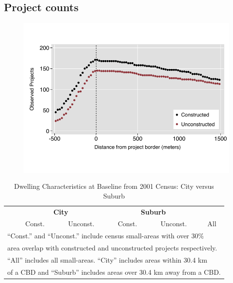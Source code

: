 \documentclass[12pt]{article}
\begin{document}
\pagebreak
\subsection{Project counts}
\label{appendix:projectcounts}
\vspace{-5mm}
\begin{figure}[h!]
\centering
\includegraphics[scale=1.2,trim={.1cm 1.2cm .1cm 1.2cm},clip]{figures/projectcounts_4.pdf}
\end{figure}



\begin{table}[h!]
	\centering
	\caption{Dwelling Characteristics at Baseline from 2001 Census: City versus Suburb}\label{table:projectdescriptivescensushet}
\vspace{-2mm}
\begin{tabular}{l*{1}{ccccc}}
\toprule
& \multicolumn{2}{c}{\textbf{City}} & \multicolumn{2}{c}{\textbf{Suburb}} &   \\
& Const. & Unconst. & Const. & Unconst. &  All  \\
\midrule
 
\bottomrule
\multicolumn{6}{l}{\scriptsize ``Const.'' and ``Unconst.'' include census small-areas with over 30\% }  \\ [-.5em]
\multicolumn{6}{l}{\scriptsize  area overlap with constructed and unconstructed projects respectively. } \\ [-.5em]
\multicolumn{6}{l}{\scriptsize ``All''  includes all small-areas.  ``City'' includes areas within 30.4 km } \\ [-.5em]
\multicolumn{6}{l}{\scriptsize of a CBD and ``Suburb'' includes areas over 30.4 km away from a CBD. } 
\end{tabular}
\end{table}
\end{document}
